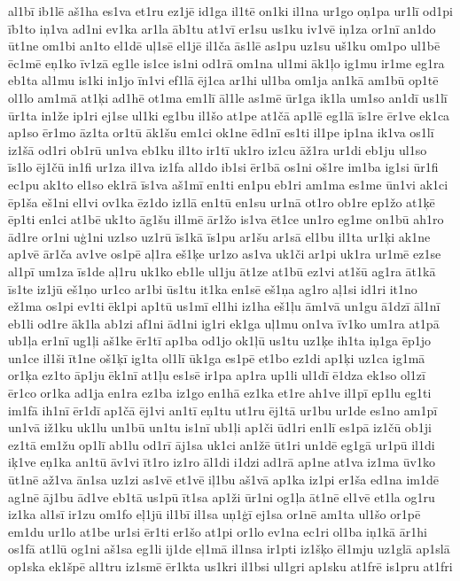 {al1bī
ib1lē
aš1ha
es1va
et1ru
ez1jē
id1ga
il1tē
on1ki
il1na
ur1go
oņ1pa
ur1lī
od1pi
īb1to
iņ1va
ad1ni
ev1ka
ar1la
āb1tu
at1vī
er1su
us1ku
iv1vē
iņ1za
or1nī
an1do
ūt1ne
om1bi
an1to
el1dē
uļ1sē
el1jē
il1ča
ās1lē
as1pu
uz1su
uš1ku
om1po
ul1bē
ēc1mē
eņ1ko
īv1zā
eg1le
is1ce
is1ni
od1rā
om1na
ul1mi
āk1ļo
ig1mu
ir1me
eg1ra
eb1ta
al1mu
is1ki
in1jo
īn1vi
ef1lā
ēj1ca
ar1hi
ul1ba
om1ja
an1kā
am1bū
op1tē
ol1lo
am1mā
at1ķi
ad1hē
ot1ma
em1lī
āl1le
as1mē
ūr1ga
ik1la
um1so
an1dī
us1lī
ūr1ta
in1že
ip1ri
ej1se
ul1ki
eg1bu
il1šo
at1pe
at1čā
ap1lē
eg1lā
īs1re
ēr1ve
ek1ca
ap1so
ēr1mo
āz1ta
or1tū
āk1šu
em1ci
ok1ne
ēd1nī
es1ti
il1pe
ip1na
ik1va
os1lī
iz1šā
od1ri
ob1rū
un1va
eb1ku
il1to
ir1tī
uk1ro
iz1cu
āž1ra
ur1di
eb1ju
ul1so
īs1lo
ēj1čū
in1fi
ur1za
il1va
iz1fa
al1do
ib1si
ēr1bā
os1ni
oš1re
im1ba
ig1si
ūr1fi
ec1pu
ak1to
el1so
ek1rā
īs1va
aš1mī
en1ti
en1pu
eb1ri
am1ma
es1me
ūn1vi
ak1ci
ēp1ša
eš1ni
el1vi
ov1ka
ēz1do
iz1lā
en1tū
en1su
ur1nā
ot1ro
ob1re
ep1žo
at1ķē
ēp1ti
en1ci
at1bē
uk1to
āg1šu
il1mē
ār1žo
is1va
ēt1ce
un1ro
eg1me
on1bū
ah1ro
ād1re
or1ni
uģ1ni
uz1so
uz1rū
īs1kā
īs1pu
ar1šu
ar1sā
el1bu
il1ta
ur1ķi
ak1ne
ap1vē
ār1ča
av1ve
os1pē
aļ1ra
eš1ķe
ur1zo
as1va
uk1či
ar1pi
uk1ra
ur1mē
ez1se
al1pī
um1za
īs1de
aļ1ru
uk1ko
eb1le
ul1ju
āt1ze
at1bū
ez1vi
at1šū
ag1ra
āt1kā
īs1te
iz1jū
eš1ņo
ur1co
ar1bi
ūs1tu
it1ka
en1sē
eš1ņa
ag1ro
aļ1si
id1ri
it1no
ež1ma
os1pi
ev1ti
ēk1pi
ap1tū
us1mī
el1hi
iz1ha
eš1ļu
ām1vā
un1gu
ā1dzī
āl1nī
eb1li
od1re
āk1la
ab1zi
af1ni
ād1ni
ig1ri
ek1ga
uļ1mu
on1va
īv1ko
um1ra
at1pā
ub1ļa
er1nī
ug1ļi
aš1ke
ēr1tī
ap1ba
od1jo
ok1ļū
us1tu
uz1ķe
ih1ta
iņ1ga
ēp1jo
un1ce
il1ši
īt1ne
oš1ķī
ig1ta
ol1lī
ūk1ga
es1pē
et1bo
ez1di
ap1ķi
uz1ca
ig1mā
or1ķa
ez1to
āp1ju
ēk1nī
at1ļu
es1sē
ir1pa
ap1ra
up1li
ul1dī
ē1dza
ek1so
ol1zī
ēr1co
or1ka
ad1ja
en1ra
ez1ba
iz1go
en1hā
ez1ka
et1re
ah1ve
il1pī
ep1lu
eg1ti
im1fā
ih1nī
ēr1dī
ap1čā
ēj1vi
an1tī
eņ1tu
ut1ru
ēj1tā
ur1bu
ur1de
es1no
am1pī
un1vā
iž1ku
uk1lu
un1bū
un1tu
is1nī
ub1ļi
ap1či
ūd1ri
en1lī
es1pā
iz1čū
ob1ji
ez1tā
em1žu
op1lī
ab1lu
od1rī
āj1sa
uk1ci
an1žē
ūt1ri
un1dē
eg1gā
ur1pū
il1di
iķ1ve
eņ1ka
an1tū
āv1vi
īt1ro
iz1ro
āl1di
i1dzi
ad1rā
ap1ne
at1va
iz1ma
ūv1ko
ūt1nē
až1va
ān1sa
uz1zi
as1vē
et1vē
iļ1bu
aš1vā
ap1ka
iz1pi
er1ša
ed1na
im1dē
ag1nē
āj1bu
ād1ve
eb1tā
us1pū
īt1sa
ap1ži
ūr1ni
og1ļa
āt1nē
el1vē
et1la
og1ru
iz1ka
al1sī
ir1zu
om1fo
eļ1jū
il1bī
il1sa
uņ1ģī
ej1sa
or1nē
am1ta
ul1šo
or1pē
em1du
ur1lo
at1be
ur1si
ēr1ti
er1šo
at1pi
or1lo
ev1na
ec1ri
ol1ba
iņ1kā
ār1hi
os1fā
at1lū
og1ni
aš1sa
eg1li
ij1de
eļ1mā
il1nsa
ir1pti
iz1šķo
ēl1mju
uz1glā
ap1slā
op1ska
ek1špē
al1tru
iz1smē
ēr1kta
us1kri
il1bsi
ul1gri
ap1sku
at1frē
is1pru
at1fri
}
